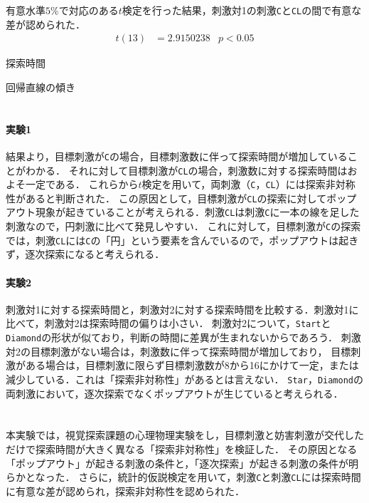 有意水準\(5\%\)で対応のある\(t\)検定を行った結果，刺激対1の刺激\texttt{C}と\texttt{CL}の間で有意な差が認められた．
\begin{align}
    t(13) & =2.9150238 & p<0.05
\end{align}
\begin{table}[H]
    \centering
    \caption{探索時間}
    \label{tbl:探索時間}
    \fontsize{4}{7}\selectfont\ttfamily
    
\end{table}
\begin{table}[H]
    \centering
    \caption{回帰直線の傾き}
    \label{tbl:回帰直線の傾き}
    \fontsize{4}{7}\selectfont\ttfamily
    
\end{table}
\section{\consideration}
\paragraph{実験1}
結果より，目標刺激が\texttt{C}の場合，目標刺激数に伴って探索時間が増加していることがわかる．
それに対して目標刺激が\texttt{CL}の場合，刺激数に対する探索時間はおよそ一定である．
これらから\(t\)検定を用いて，両刺激（\texttt{C}，\texttt{CL}）には探索非対称性があると判断された．
この原因として，目標刺激が\texttt{CL}の探索に対してポップアウト現象が起きていることが考えられる．刺激\texttt{CL}は刺激\texttt{C}に一本の線を足した刺激なので，円刺激に比べて発見しやすい．
これに対して，目標刺激が\texttt{C}の探索では，刺激\texttt{CL}には\texttt{C}の「円」という要素を含んでいるので，ポップアウトは起きず，逐次探索になると考えられる．
\paragraph{実験2}
刺激対1に対する探索時間と，刺激対2に対する探索時間を比較する．刺激対1に比べて，刺激対2は探索時間の偏りは小さい．
刺激対2について，\texttt{Start}と\texttt{Diamond}の形状が似ており，判断の時間に差異が生まれないからであろう．
刺激対2の目標刺激がない場合は，刺激数に伴って探索時間が増加しており，
目標刺激がある場合は，目標刺激に限らず目標刺激数が8から16にかけて一定，または減少している．これは「探索非対称性」があるとは言えない．
\texttt{Star}，\texttt{Diamond}の両刺激において，逐次探索でなくポップアウトが生じていると考えられる．
\section{\conclusion}
本実験では，視覚探索課題の心理物理実験をし，目標刺激と妨害刺激が交代しただけで探索時間が大きく異なる「探索非対称性」を検証した．
その原因となる「ポップアウト」が起きる刺激の条件と，「逐次探索」が起きる刺激の条件が明らかとなった．
さらに，統計的仮説検定を用いて，刺激\texttt{C}と刺激\texttt{CL}には探索時間に有意な差が認められ，探索非対称性を認められた．

